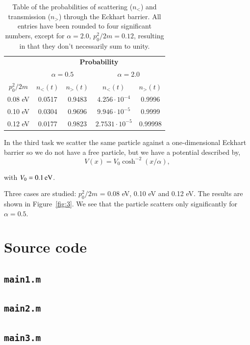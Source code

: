 \begin{table}[H]
	\centering
	\caption{Table of the probabilities of scattering ($n_<$) and transmission ($n_>$) through the Eckhart barrier. All entries have been rounded to four significant numbers, except for $\alpha = 2.0$, $p_0^2/2m = 0.12$, resulting in that they don't necessarily sum to unity.}
	\begin{tabular}{c|cc|cc}
					& \multicolumn{4}{c}{\textbf{Probability}} \\
					& \multicolumn{2}{c|}{$\alpha = 0.5$} & \multicolumn{2}{c}{$\alpha = 2.0$} \\
		$p_0^2/2m$	& $n_<(t)$	& $n_>(t)$	& $n_<(t)$	& $n_>(t)$	\\ \hline
		0.08 eV		& 0.0517	& 0.9483	& $4.256 \cdot 10^{-4}$	& 0.9996	\\
		0.10 eV		& 0.0304	& 0.9696	& $9.946 \cdot 10^{-5}$	& 0.9999	\\
		0.12 eV		& 0.0177	& 0.9823	& $2.7531 \cdot 10^{-5}$ & 0.99998
	\end{tabular}
	\label{tab:3}
\end{table}

In the third task we scatter the same particle against a one-dimensional Eckhart barrier so we do not have a free particle, but we have a potential described by,
\begin{equation}
V(x) = V_0 \cosh^{-2} (x/\alpha),
\end{equation}

with $V_0 = \unit[0.1]{eV}$.

Three cases are studied: $p_0^2/2m$ = 0.08 eV, 0.10 eV and 0.12 eV. The results are shown in Figure~\ref{fig:3}. We see that the particle scatters only significantly for $\alpha = 0.5$.








\appendix
\section{Source code}

\subsection{\texttt{main1.m}}


\subsection{\texttt{main2.m}}


\subsection{\texttt{main3.m}}


%

